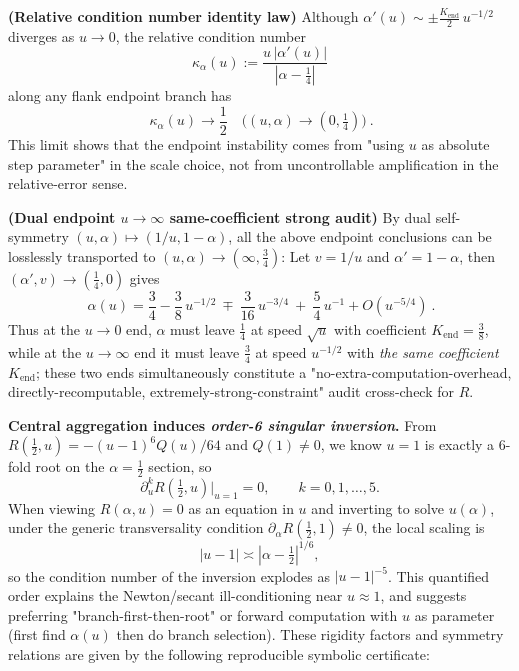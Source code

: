 \begin{remark}[Structure of the elimination curve: dual symmetry, endpoint singular loci, and \texorpdfstring{$\alpha=\tfrac12$}{alpha=1/2} aggregation fingerprint]
\par
\noindent\textbf{(Relative condition number identity law)}
Although \(\alpha'(u)\sim \pm \tfrac{K_{\mathrm{end}}}{2}\,u^{-1/2}\) diverges as \(u\to0\), the relative condition number
\[
\kappa_\alpha(u):=\frac{u\,|\alpha'(u)|}{|\alpha-\tfrac14|}
\]
along any flank endpoint branch has
\[
\boxed{\ \kappa_\alpha(u)\to\frac12\quad\bigl((u,\alpha)\to(0,\tfrac14)\bigr)\ }.
\]
This limit shows that the endpoint instability comes from "using \(u\) as absolute step parameter" in the scale choice, not from uncontrollable amplification in the relative-error sense.
\par
\noindent\textbf{(Dual endpoint \(u\to\infty\) same-coefficient strong audit)}
By dual self-symmetry \((u,\alpha)\mapsto(1/u,1-\alpha)\), all the above endpoint conclusions can be losslessly transported to \((u,\alpha)\to(\infty,\tfrac34)\):
Let \(v=1/u\) and \(\alpha'=1-\alpha\), then \((\alpha',v)\to(\tfrac14,0)\) gives
\[
\boxed{\ \alpha(u)=\frac34-\frac38\,u^{-1/2}\ \mp\ \frac{3}{16}\,u^{-3/4}\ +\ \frac54\,u^{-1}+O(u^{-5/4})\ }.
\]
Thus at the \(u\to0\) end, \(\alpha\) must leave \(\tfrac14\) at speed \(\sqrt{u}\) with coefficient \(K_{\mathrm{end}}=\tfrac38\), while at the \(u\to\infty\) end it must leave \(\tfrac34\) at speed \(u^{-1/2}\) with \emph{the same coefficient} \(K_{\mathrm{end}}\); these two ends simultaneously constitute a "no-extra-computation-overhead, directly-recomputable, extremely-strong-constraint" audit cross-check for \(R\).
\par
\noindent\textbf{Central aggregation induces \emph{order-6 singular inversion}.}
From \(R(\tfrac12,u)=-(u-1)^6Q(u)/64\) and \(Q(1)\neq0\), we know \(u=1\) is exactly a \(6\)-fold root on the \(\alpha=\tfrac12\) section, so
\[
\partial_u^k R\!\left(\tfrac12,u\right)\Big|_{u=1}=0,\qquad k=0,1,\dots,5.
\]
When viewing \(R(\alpha,u)=0\) as an equation in \(u\) and inverting to solve \(u(\alpha)\), under the generic transversality condition \(\partial_\alpha R(\tfrac12,1)\neq0\), the local scaling is
\[
|u-1|\asymp|\alpha-\tfrac12|^{1/6},
\]
so the condition number of the inversion explodes as \(|u-1|^{-5}\).
This quantified order explains the Newton/secant ill-conditioning near \(u\approx1\), and suggests preferring "branch-first-then-root" or forward computation with \(u\) as parameter (first find \(\alpha(u)\) then do branch selection).
These rigidity factors and symmetry relations are given by the following reproducible symbolic certificate:

\end{remark}


